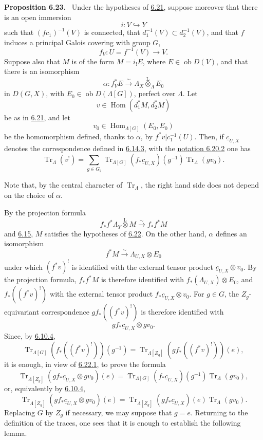 \documentclass[11pt]{article}
\newenvironment{statement}[1]{\par\medskip\noindent\textbf{#1.}\ }{\par\medskip}
\DeclareMathOperator{\Hom}{Hom}
\providecommand{\Tr}{\operatorname{Tr}}
\providecommand{\Tr}{\operatorname{Tr}}
\providecommand{\lten}{\overset{\mathrm L}{\otimes}}
\providecommand{\Ob}{\operatorname{ob}}
\providecommand{\Tr}{\operatorname{Tr}}
\providecommand{\Hom}{\operatorname{Hom}}
\providecommand{\lten}{\overset{\mathrm L}{\otimes}}
\providecommand{\lten}{\overset{\mathrm L}{\otimes}}
\providecommand{\Ob}{\operatorname{ob}}
\providecommand{\Tr}{\operatorname{Tr}}
\providecommand{\lten}{\overset{\mathrm L}{\otimes}}
\providecommand{\lten}{\overset{\mathrm L}{\otimes}}
\providecommand{\Ob}{\operatorname{Ob}}
\providecommand{\lten}{\overset{\mathrm L}{\otimes}}
\providecommand{\Hom}{\operatorname{Hom}}
\providecommand{\Tr}{\operatorname{Tr}}
\providecommand{\Ob}{\operatorname{ob}}
\providecommand{\Ob}{\operatorname{Ob}}
\providecommand{\lten}{\overset{\mathrm L}{\otimes}}
\begin{document}
\label{sga5:IIIB:proposition:6.23}\begin{statement}{Proposition 6.23}
Under the hypotheses of \hyperref[sga5:IIIB:proposition:6.21]{6.21}, suppose moreover that there is an open immersion
\[
i:V\hookrightarrow Y
\]
such that $(fc_1)^{-1}(V)$ is connected, that $d_1^{-1}(V)\subset d_2^{-1}(V)$, and that $f$ induces a principal Galois covering with group $G$,
\[
f_V:U=f^{-1}(V)\to V.
\]
Suppose also that $M$ is of the form $M=i_!E$, where $E\in\Ob D(V)$, and that there is an isomorphism
\[
\alpha:f_V^*E\xrightarrow{\sim}\Lambda_X\lten_{\Lambda}E_0
\]
in $D(G,X)$, with $E_0\in\Ob D(\Lambda[G])$, perfect over $\Lambda$. Let
\[
v\in\Hom(d_1^*M,d_2^*M)
\]
be as in \hyperref[sga5:IIIB:proposition:6.21]{6.21}, and let
\[
v_0\in\Hom_{\Lambda[G]}(E_0,E_0)
\]
be the homomorphism defined, thanks to $\alpha$, by $f^*v|c_1^{-1}(U)$. Then, if $\underline c_{U,X}$ denotes the correspondence defined in \hyperref[sga5:IIIB:equation:6.14.3]{6.14.3}, with the \hyperref[sga5:IIIB:equation:6.20.2]{notation 6.20.2} one has
\begin{equation}
\Tr_{\Lambda}(v^!)
=
\sum_{g\in G_{\natural}}
\Tr_{\Lambda[G]}(f_*\underline c_{U,X})(g^{-1})\Tr_{\Lambda}(gv_0).
\tag{6.23.1}\label{sga5:IIIB:equation:6.23.1}
\end{equation}
\end{statement}

Note that, by the central character of $\Tr_{\Lambda}$, the right hand side does not depend on the choice of $\alpha$.

By the projection formula
\[
f_*f^*\Lambda_Y\lten M\xrightarrow{\sim}f_*f^*M
\]
and \hyperref[sga5:IIIB:subsection:6.15]{6.15}, $M$ satisfies the hypotheses of \hyperref[sga5:IIIB:corollary:6.22]{6.22}. On the other hand, $\alpha$ defines an isomorphism
\[
f^*M\xrightarrow{\sim}\Lambda_{U,X}\otimes E_0
\]
under which $(f^*v)^!$ is identified with the external tensor product $\underline c_{U,X}\otimes v_0$. By the projection formula, $f_*f^*M$ is therefore identified with $f_*(\Lambda_{U,X})\otimes E_0$, and $f_*((f^*v)^!)$ with the external tensor product $f_*\underline c_{U,X}\otimes v_0$. For $g\in G$, the $Z_g$-equivariant correspondence $gf_*((f^*v)^!)$ is therefore identified with
\[
gf_*\underline c_{U,X}\otimes gv_0.
\]
Since, by \hyperref[sga5:IIIB:equation:6.10.4]{6.10.4},
\[
\Tr_{\Lambda[G]}(f_*((f^*v)^!))(g^{-1})
=
\Tr_{\Lambda[Z_g]}(gf_*((f^*v)^!))(e),
\]
it is enough, in view of \hyperref[sga5:IIIB:equation:6.22.1]{6.22.1}, to prove the formula
\[
\Tr_{\Lambda[Z_g]}(gf_*\underline c_{U,X}\otimes gv_0)(e)
=
\Tr_{\Lambda[G]}(f_*\underline c_{U,X})(g^{-1})\Tr_{\Lambda}(gv_0),
\]
or, equivalently by \hyperref[sga5:IIIB:equation:6.10.4]{6.10.4},
\begin{equation}
\Tr_{\Lambda[Z_g]}(gf_*\underline c_{U,X}\otimes gv_0)(e)
=
\Tr_{\Lambda[Z_g]}(gf_*\underline c_{U,X})(e)\Tr_{\Lambda}(gv_0).
\tag{6.23.2}\label{sga5:IIIB:equation:6.23.2}
\end{equation}
Replacing $G$ by $Z_g$ if necessary, we may suppose that $g=e$. Returning to the definition of the traces, one sees that it is enough to establish the following lemma.
\end{document}
